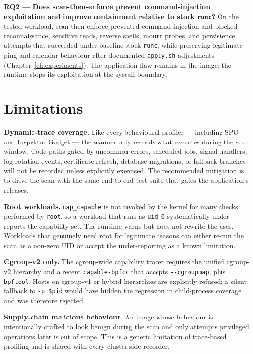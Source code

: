 \textbf{RQ2 --- Does scan-then-enforce prevent command-injection exploitation and improve containment relative to stock \texttt{runc}?} On the tested workload, scan-then-enforce prevented command injection and blocked reconnaissance, sensitive reads, reverse shells, mount probes, and persistence attempts that succeeded under baseline stock \texttt{runc}, while preserving legitimate ping and calendar behaviour after documented \texttt{apply.sh} adjustments (Chapter~\ref{ch:experiments}). The application flaw remains in the image; the runtime stops its exploitation at the syscall boundary.

\section{Limitations}

\textbf{Dynamic-trace coverage.} Like every behavioural profiler --- including SPO and Inspektor Gadget --- the scanner only records what executes during the scan window. Code paths gated by uncommon errors, scheduled jobs, signal handlers, log-rotation events, certificate refresh, database migrations, or fallback branches will not be recorded unless explicitly exercised. The recommended mitigation is to drive the scan with the same end-to-end test suite that gates the application's releases.

\textbf{Root workloads.} \texttt{cap\_capable} is not invoked by the kernel for many checks performed by \texttt{root}, so a workload that runs as \texttt{uid 0} systematically under-reports the capability set. The runtime warns but does not rewrite the user. Workloads that genuinely need root for legitimate reasons can either re-run the scan as a non-zero UID or accept the under-reporting as a known limitation.

\textbf{Cgroup-v2 only.} The cgroup-wide capability tracer requires the unified cgroup-v2 hierarchy and a recent \texttt{capable-bpfcc} that accepts \texttt{-{}-cgroupmap}, plus \texttt{bpftool}. Hosts on cgroup-v1 or hybrid hierarchies are explicitly refused; a silent fallback to \texttt{-p \$pid} would have hidden the regression in child-process coverage and was therefore rejected.

\textbf{Supply-chain malicious behaviour.} An image whose behaviour is intentionally crafted to look benign during the scan and only attempts privileged operations later is out of scope. This is a generic limitation of trace-based profiling and is shared with every cluster-side recorder.

